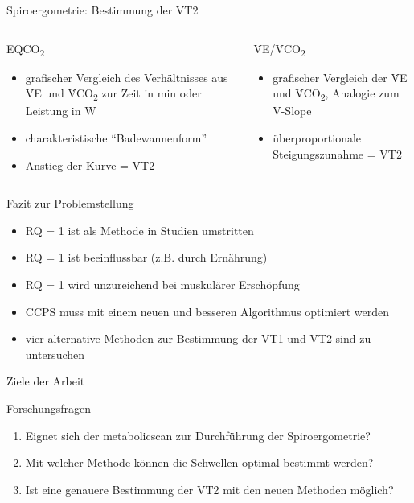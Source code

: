 \documentclass[colorBG,slideColor,9pt]{beamer}
\newcommand{\eqcotwo}{EQCO\textsubscript{2}}
\newcommand{\vcotwo}{\.{V}CO\textsubscript{2}}
\newcommand{\ve}{\.{V}E}
\begin{document}
\begin{frame}{Spiroergometrie: Bestimmung der VT2}
\begin{columns}
	\begin{column}[t]{5cm}
		\begin{block}{\eqcotwo}
			\begin{itemize}
				\item grafischer Vergleich des Verhältnisses aus \ve{} und \vcotwo{} zur Zeit in \si{\minute} oder Leistung in \si{\watt}
				\item charakteristische "`Badewannenform"'
				\item Anstieg der Kurve = VT2
			\end{itemize}
		\end{block}
	\end{column}
	\begin{column}[t]{5cm}
		\begin{block}{\ve/\vcotwo}
			\begin{itemize}
				\item grafischer Vergleich der \ve{} und \vcotwo{}, Analogie zum V-Slope
				\item überproportionale Steigungszunahme = VT2
			\end{itemize}
		\end{block}
	\end{column}
\end{columns}
\end{frame}

\begin{frame}{Fazit zur Problemstellung}
\begin{itemize}
	\item RQ = 1 ist als Methode in Studien umstritten
	\item RQ = 1 ist beeinflussbar (z.B. durch Ernährung)
	\item RQ = 1 wird unzureichend bei muskulärer Erschöpfung
	\item CCPS muss mit einem neuen und besseren Algorithmus optimiert werden
	\item vier alternative Methoden zur Bestimmung der VT1 und VT2 sind zu untersuchen
\end{itemize}
\end{frame}

\begin{frame}{Ziele der Arbeit}
\begin{block}{Forschungsfragen}
\begin{enumerate}
	\item Eignet sich der metabolicscan zur Durchführung der Spiroergometrie?
	\item Mit welcher Methode können die Schwellen optimal bestimmt werden?
	\item Ist eine genauere Bestimmung der VT2 mit den neuen Methoden möglich?
\end{enumerate}
\end{block}
\end{frame}
\end{document}
